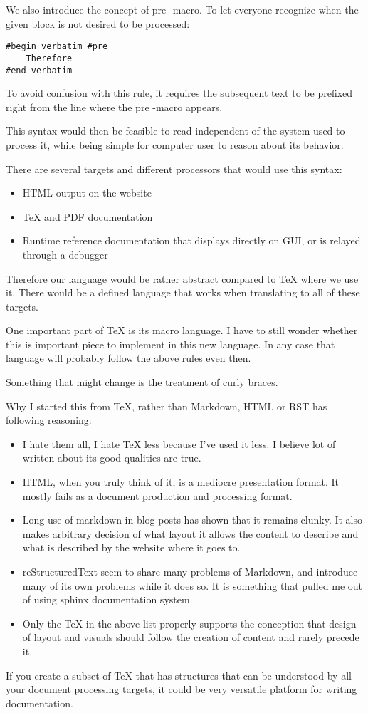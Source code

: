 \documentclass{article}
\begin{document}
We also introduce the concept of pre -macro. To let
everyone recognize when the given block is not desired to be
processed:

\begin{verbatim}
#begin verbatim #pre
    Therefore
#end verbatim
\end{verbatim}

To avoid confusion with this rule, it requires the
subsequent text to be prefixed right from the line where the
pre -macro appears.

This syntax would then be feasible to read independent of
the system used to process it, while being
simple for computer user to reason about its behavior.


There are several targets and different processors that
would use this syntax:

\begin{itemize}
    \item HTML output on the website
    \item TeX and PDF documentation
    \item Runtime reference documentation that displays
        directly on GUI, or is relayed through a debugger
\end{itemize}

Therefore our language would be rather abstract compared to
TeX where we use it. There would be a defined language that
works when translating to all of these targets.

One important part of TeX is its macro language. I have to
still wonder whether this is important piece to implement in
this new language. In any case that language will probably
follow the above rules even then.

Something that might change is the treatment of curly braces.


Why I started this from TeX, rather than Markdown, HTML or
RST has following reasoning:

\begin{itemize}
    \item
        I hate them all, I hate TeX less because I've used
        it less. I believe lot of written about its good
        qualities are true.
    \item
        HTML, when you truly think of it, is a mediocre
        presentation format. It mostly fails as a
        document production and processing format.
    \item
        Long use of markdown in blog posts has shown that it
        remains clunky. It also makes arbitrary decision of
        what layout it allows the content to describe and
        what is described by the website where it goes to.
    \item
        reStructuredText seem to share many problems of
        Markdown, and introduce many of its own problems
        while it does so. It is something that pulled me out
        of using sphinx documentation system.
    \item
        Only the TeX in the above list properly supports the
        conception that design of layout and visuals should
        follow the creation of content and rarely precede it.
\end{itemize}

If you create a subset of TeX that has structures that can
be understood by all your document processing targets, it
could be very versatile platform for writing documentation.
\end{document}
